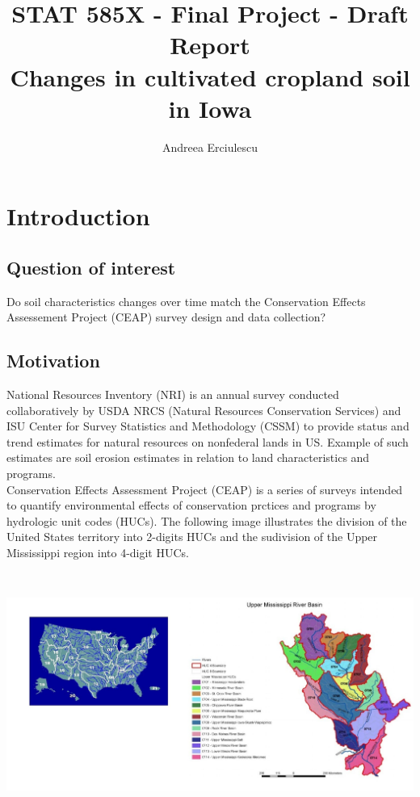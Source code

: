 \documentclass{article}\usepackage[]{graphicx}\usepackage[]{color}
\begin{document}
\title{STAT 585X - Final Project - Draft Report \\ Changes in cultivated cropland soil in Iowa }

\author{Andreea Erciulescu}
\maketitle


\section{Introduction}

\subsection{Question of interest}


Do soil characteristics changes over time match the Conservation Effects Assessement Project (CEAP) survey design and data collection?

\subsection{Motivation}

National Resources Inventory (NRI) is an annual survey conducted collaboratively by USDA NRCS (Natural Resources Conservation Services) and ISU Center for Survey Statistics and Methodology (CSSM) to provide status and trend estimates for natural resources on nonfederal lands in US. Example of such estimates are soil erosion estimates in relation to land characteristics and programs.\\

Conservation Effects Assessment Project (CEAP) is a series of surveys intended to quantify environmental effects of conservation prctices and programs by hydrologic unit codes (HUCs). The following image illustrates the division of the United States territory into 2-digits HUCs and the sudivision of the Upper Mississippi region into 4-digit HUCs.  

\begin{center}
\includegraphics[width=16cm, height=8cm]{HUC2-4-8.jpg} 
\end{center}
\end{document}
